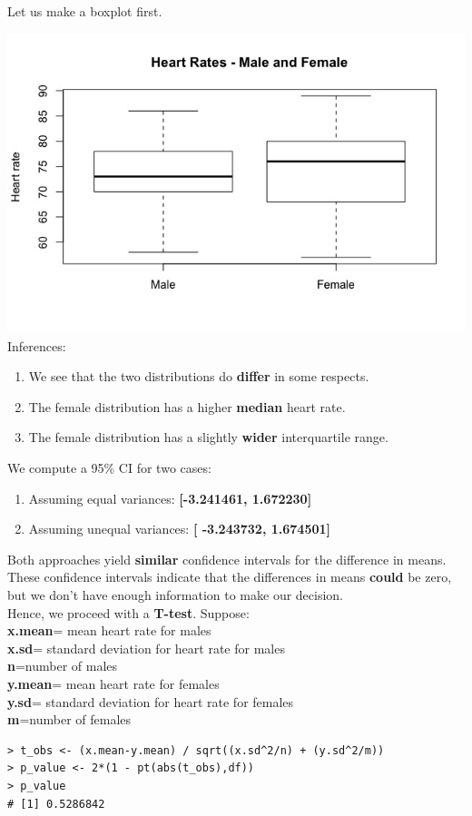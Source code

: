 \documentclass[12pt,letterpaper,titlepage,en-US]{article}
\begin{document}
 Let us make a boxplot first.


\includegraphics[scale=0.6]{hrate.jpeg}\\


Inferences:
\begin{enumerate}
\item We see that the two distributions do \textbf{differ} in some respects. 
\item The female distribution has a higher \textbf{median} heart rate.
\item The female distribution has a slightly \textbf{wider} interquartile range.
\end{enumerate}


We compute a 95\% CI for two cases:
\begin{enumerate}
\item Assuming equal variances: \textbf{[-3.241461, 1.672230]}
\item Assuming unequal variances: \textbf{[ -3.243732,  1.674501]}

\end{enumerate}
Both approaches yield \textbf{similar} confidence intervals for the difference in means. These confidence intervals indicate that the differences in means \textbf{could} be zero, but we don't have enough information to make our decision. \\

Hence, we proceed with a \textbf{T-test}. Suppose:\\
\textbf{x.mean}= mean heart rate for males \\
\textbf{x.sd}= standard deviation for heart rate for males\\
\textbf{n}=number of males\\
\textbf{y.mean}= mean heart rate for females \\
\textbf{y.sd}= standard deviation for heart rate for females\\
\textbf{m}=number of females
\begin{knitrout}
\color{fgcolor}
\begin{kframe}
\begin{verbatim}
> t_obs <- (x.mean-y.mean) / sqrt((x.sd^2/n) + (y.sd^2/m))
> p_value <- 2*(1 - pt(abs(t_obs),df))
> p_value
# [1] 0.5286842
\end{verbatim}
\end{kframe}
\end{knitrout}
\end{document}

